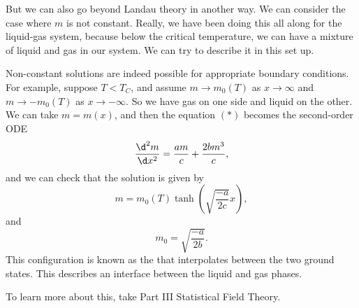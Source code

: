 \documentclass[a4paper]{article}
\begin{document}
But we can also go beyond Landau theory in another way. We can consider the case where $m$ is not constant. Really, we have been doing this all along for the liquid-gas system, because below the critical temperature, we can have a mixture of liquid and gas in our system. We can try to describe it in this set up.

Non-constant solutions are indeed possible for appropriate boundary conditions. For example, suppose $T < T_C$, and assume $m \to m_0(T)$ as $x \to \infty$ and $m \to - m_0(T)$ as $x \to -\infty$. So we have gas on one side and liquid on the other. We can take $m = m(x)$, and then the equation $(*)$ becomes the second-order ODE
\[
  \frac{\d^2 m}{\d x^2} = \frac{am}{c} + \frac{2b m^3}{c},
\]
and we can check that the solution is given by
\[
  m = m_0(T) \tanh\left(\sqrt{\frac{-a}{2c}} x\right),
\]
and
\[
  m_0 = \sqrt{\frac{-a}{2b}}.
\]
This configuration is known as the  that interpolates between the two ground states. This describes an interface between the liquid and gas phases.
\begin{center}
\end{center}
To learn more about this, take Part III Statistical Field Theory.
\printindex
\end{document}

